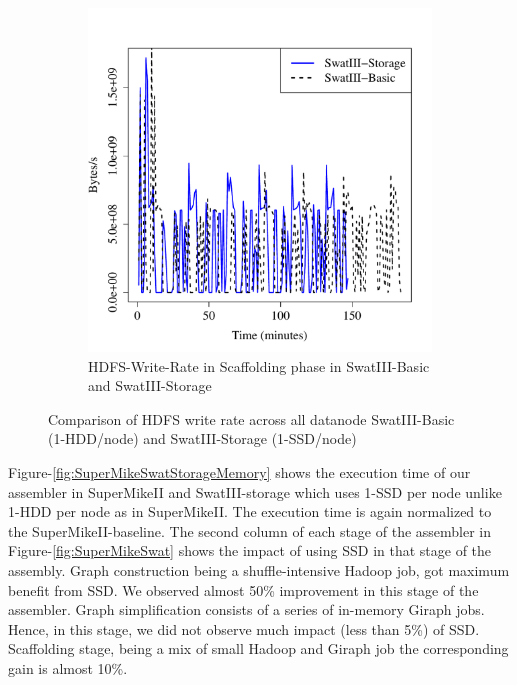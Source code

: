 \documentclass[conference]{IEEEtran}
\begin{document}
\begin{figure}[htb]
\begin{subfigure}[b]{0.3\textwidth}
                \includegraphics[width=\textwidth]{Figure/SystemData/Plots/SCFHddSsdHdfsWrIops.pdf}
                \caption{HDFS-Write-Rate in Scaffolding phase in SwatIII-Basic and SwatIII-Storage}
                \label{fig:SCFHddSsdHdfsWrIops}
        \end{subfigure}        
        \caption{Comparison of HDFS write rate across all datanode SwatIII-Basic (1-HDD/node) and SwatIII-Storage (1-SSD/node)}\label{fig:HddSsdHdfsRWps}
        
\end{figure}
Figure-\ref{fig:SuperMikeSwatStorageMemory} shows the execution time of our assembler in SuperMikeII and SwatIII-storage which uses 1-SSD per node unlike 1-HDD per node as in SuperMikeII.
The execution time is again normalized to the SuperMikeII-baseline.
The second column of each stage of the assembler in Figure-\ref{fig:SuperMikeSwat} shows the impact of using SSD in that stage of the assembly.
Graph construction being a shuffle-intensive Hadoop job, got maximum benefit from SSD. We observed almost 50\% improvement in this stage of the assembler. Graph simplification consists of a series of in-memory Giraph jobs. Hence, in this stage, we did not observe much impact (less than 5\%) of SSD. Scaffolding stage, being a mix of small Hadoop and Giraph job the corresponding gain is almost 10\%.
\end{document}
